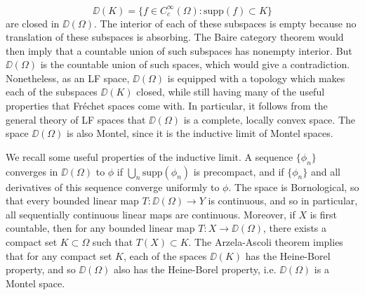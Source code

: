 %
\[ \DD(K) = \{ f \in C_c^\infty(\Omega): \text{supp}(f) \subset K \} \]
%
are closed in $\DD(\Omega)$. The interior of each of these subspaces is empty because no translation of these subspaces is absorbing. The Baire category theorem would then imply that a countable union of such subspaces has nonempty interior. But $\DD(\Omega)$ is the countable union of such spaces, which would give a contradiction. Nonetheless, as an LF space, $\DD(\Omega)$ is equipped with a topology which makes each of the subspaces $\DD(K)$ closed, while still having many of the useful properties that Fr\'{e}chet spaces come with.
%
%
%
%
In particular, it follows from the general theory of LF spaces that $\DD(\Omega)$ is a complete, locally convex space. The space $\DD(\Omega)$ is also Montel, since it is the inductive limit of Montel spaces.

We recall some useful properties of the inductive limit. A sequence $\{ \phi_n \}$ converges in $\DD(\Omega)$ to $\phi$ if $\bigcup_n \text{supp}(\phi_n)$ is precompact, and if $\{ \phi_n \}$ and all derivatives of this sequence converge uniformly to $\phi$. The space is Bornological, so that every bounded linear map $T: \DD(\Omega) \to Y$ is continuous, and so in particular, all sequentially continuous linear maps are continuous. Moreover, if $X$ is first countable, then for any bounded linear map $T: X \to \DD(\Omega)$, there exists a compact set $K \subset \Omega$ such that $T(X) \subset K$. The Arzela-Ascoli theorem implies that for any compact set $K$, each of the spaces $\DD(K)$ has the Heine-Borel property, and so $\DD(\Omega)$ also has the Heine-Borel property, i.e. $\DD(\Omega)$ is a Montel space.



